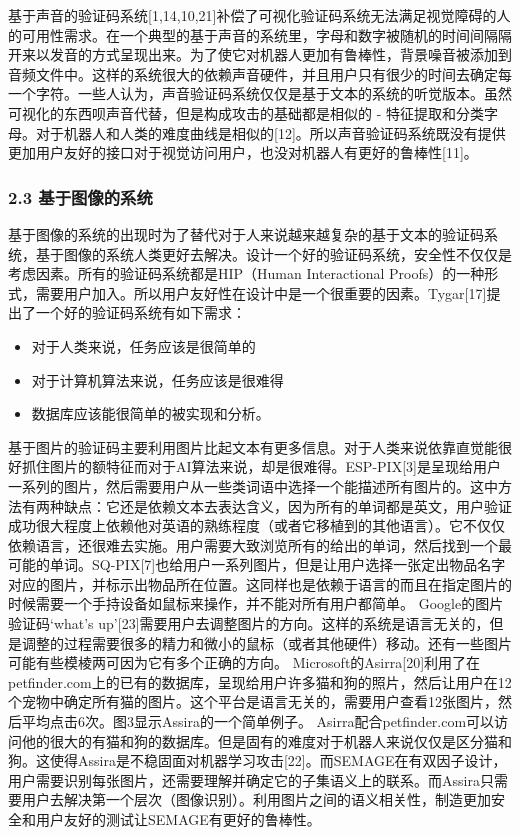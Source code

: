 基于声音的验证码系统{[}1,14,10,21{]}补偿了可视化验证码系统无法满足视觉障碍的人的可用性需求。在一个典型的基于声音的系统里，字母和数字被随机的时间间隔隔开来以发音的方式呈现出来。为了使它对机器人更加有鲁棒性，背景噪音被添加到音频文件中。这样的系统很大的依赖声音硬件，并且用户只有很少的时间去确定每一个字符。一些人认为，声音验证码系统仅仅是基于文本的系统的听觉版本。虽然可视化的东西呗声音代替，但是构成攻击的基础都是相似的
-
特征提取和分类字母。对于机器人和人类的难度曲线是相似的{[}12{]}。所以声音验证码系统既没有提供更加用户友好的接口对于视觉访问用户，也没对机器人有更好的鲁棒性{[}11{]}。

\subsubsection{2.3
基于图像的系统}\label{ux57faux4e8eux56feux50cfux7684ux7cfbux7edf}

基于图像的系统的出现时为了替代对于人来说越来越复杂的基于文本的验证码系统，基于图像的系统人类更好去解决。设计一个好的验证码系统，安全性不仅仅是考虑因素。所有的验证码系统都是HIP（Human
Interactional
Proofs）的一种形式，需要用户加入。所以用户友好性在设计中是一个很重要的因素。Tygar{[}17{]}提出了一个好的验证码系统有如下需求：

\begin{itemize}
\tightlist
\item
  对于人类来说，任务应该是很简单的
\item
  对于计算机算法来说，任务应该是很难得
\item
  数据库应该能很简单的被实现和分析。
\end{itemize}

基于图片的验证码主要利用图片比起文本有更多信息。对于人类来说依靠直觉能很好抓住图片的额特征而对于AI算法来说，却是很难得。ESP-PIX{[}3{]}是呈现给用户一系列的图片，然后需要用户从一些类词语中选择一个能描述所有图片的。这中方法有两种缺点：它还是依赖文本去表达含义，因为所有的单词都是英文，用户验证成功很大程度上依赖他对英语的熟练程度（或者它移植到的其他语言）。它不仅仅依赖语言，还很难去实施。用户需要大致浏览所有的给出的单词，然后找到一个最可能的单词。SQ-PIX{[}7{]}也给用户一系列图片，但是让用户选择一张定出物品名字对应的图片，并标示出物品所在位置。这同样也是依赖于语言的而且在指定图片的时候需要一个手持设备如鼠标来操作，并不能对所有用户都简单。
Google的图片验证码`what's
up'{[}23{]}需要用户去调整图片的方向。这样的系统是语言无关的，但是调整的过程需要很多的精力和微小的鼠标（或者其他硬件）移动。还有一些图片可能有些模棱两可因为它有多个正确的方向。
Microsoft的Asirra{[}20{]}利用了在petfinder.com上的已有的数据库，呈现给用户许多猫和狗的照片，然后让用户在12个宠物中确定所有猫的图片。这个平台是语言无关的，需要用户查看12张图片，然后平均点击6次。图3显示Assira的一个简单例子。
Asirra配合petfinder.com可以访问他的很大的有猫和狗的数据库。但是固有的难度对于机器人来说仅仅是区分猫和狗。这使得Assira是不稳固面对机器学习攻击{[}22{]}。而SEMAGE在有双因子设计，用户需要识别每张图片，还需要理解并确定它的子集语义上的联系。而Assira只需要用户去解决第一个层次（图像识别）。利用图片之间的语义相关性，制造更加安全和用户友好的测试让SEMAGE有更好的鲁棒性。

